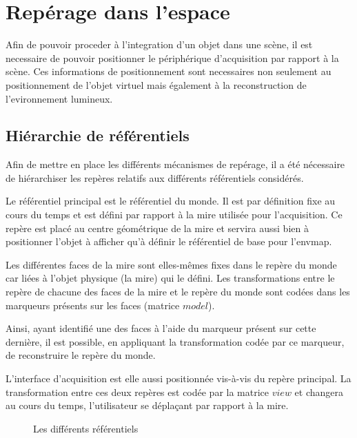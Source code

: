 \documentclass[10pt,a4paper,twoside, twocolumn]{report}
\newcommand*{\rootPath}{../}
\begin{document}
\iftwocolumn \twocolumn \else \onecolumn \fi


\chapter{Repérage dans l’espace}

Afin de pouvoir proceder à l'integration d'un objet dans une scène, il est necessaire de pouvoir positionner le périphérique d'acquisition par rapport à la scène. Ces informations de positionnement sont necessaires non seulement au positionnement de l'objet virtuel mais également à la reconstruction de l'evironnement lumineux.

\section{Hiérarchie de référentiels}

Afin de mettre en place les différents mécanismes de repérage, il a été nécessaire de hiérarchiser les repères relatifs aux différents référentiels considérés.

Le référentiel principal est le référentiel du monde. Il est par définition fixe au cours du temps et est défini par rapport à la mire utilisée pour l’acquisition. Ce repère est placé au centre géométrique de la mire et servira aussi bien à positionner l’objet à afficher qu’à définir le référentiel de base pour l’envmap.

Les différentes faces de la mire sont elles-mêmes fixes dans le repère du monde car liées à l’objet physique (la mire) qui le défini. Les transformations entre le repère de chacune des faces de la mire et le repère du monde sont codées dans les marqueurs présents sur les faces (matrice $model$).

Ainsi, ayant identifié une des faces à l’aide du marqueur présent sur cette dernière, il est possible, en appliquant la transformation codée par ce marqueur, de reconstruire le repère du monde.

L’interface d’acquisition est elle aussi positionnée vis-à-vis du repère principal. La transformation entre ces deux repères est codée par la matrice $view$ et changera au cours du temps, l’utilisateur se déplaçant par rapport à la mire.

\begin{figure}[!ht]
	\centering
	
	\caption{Les différents référentiels}
	\label{fig:tikz:spaceHierarchie}
\end{figure}
\end{document}
